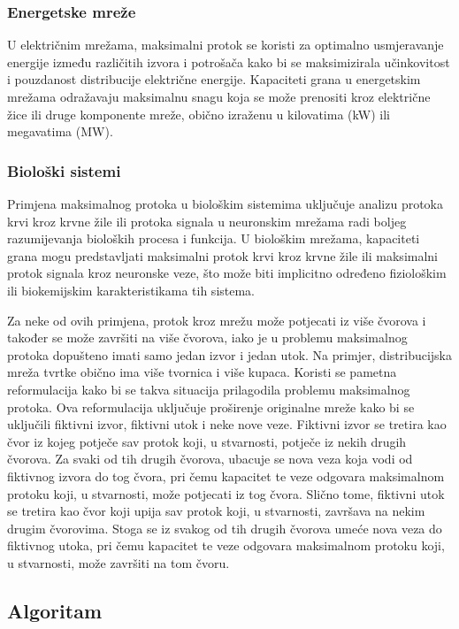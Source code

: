 \documentclass[11pt, a4paper]{article}
\begin{document}
	\subsubsection*{Energetske mreže}
	
	U električnim mrežama, maksimalni protok se koristi za optimalno usmjeravanje energije između različitih izvora i potrošača kako bi se maksimizirala učinkovitost i pouzdanost distribucije električne energije. Kapaciteti grana u energetskim mrežama odražavaju maksimalnu snagu koja se može prenositi kroz električne žice ili druge komponente mreže, obično izraženu u kilovatima (kW) ili megavatima (MW).
	
	\subsubsection*{Biološki sistemi}
	
	Primjena maksimalnog protoka u biološkim sistemima uključuje analizu protoka krvi kroz krvne žile ili protoka signala u neuronskim mrežama radi boljeg razumijevanja bioloških procesa i funkcija. U biološkim mrežama, kapaciteti grana mogu predstavljati maksimalni protok krvi kroz krvne žile ili maksimalni protok signala kroz neuronske veze, što može biti implicitno određeno fiziološkim ili biokemijskim karakteristikama tih sistema.
	
	Za neke od ovih primjena, protok kroz mrežu može potjecati iz više čvorova i također se može završiti na više čvorova, iako je u problemu maksimalnog protoka dopušteno imati samo jedan izvor i jedan utok. Na primjer, distribucijska mreža tvrtke obično ima više tvornica i više kupaca. Koristi se pametna reformulacija kako bi se takva situacija prilagodila problemu maksimalnog protoka. Ova reformulacija uključuje proširenje originalne mreže kako bi se uključili fiktivni izvor, fiktivni utok i neke nove veze. Fiktivni izvor se tretira kao čvor iz kojeg potječe sav protok koji, u stvarnosti, potječe iz nekih drugih čvorova. Za svaki od tih drugih čvorova, ubacuje se nova veza koja vodi od fiktivnog izvora do tog čvora, pri čemu kapacitet te veze odgovara maksimalnom protoku koji, u stvarnosti, može potjecati iz tog čvora. Slično tome, fiktivni utok se tretira kao čvor koji upija sav protok koji, u stvarnosti, završava na nekim drugim čvorovima. Stoga se iz svakog od tih drugih čvorova umeće nova veza do fiktivnog utoka, pri čemu kapacitet te veze odgovara maksimalnom protoku koji, u stvarnosti, može završiti na tom čvoru.
	
	\pagebreak
	\subsection{Algoritam}
	
\end{document}
